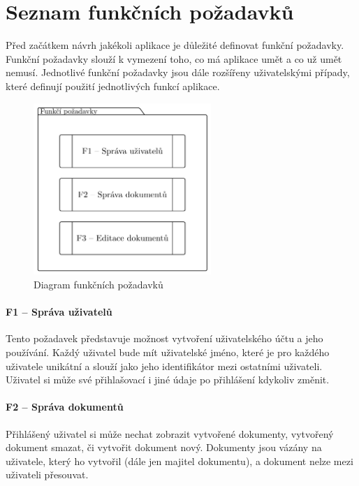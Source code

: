 
\section{Seznam funkčních požadavků}\label{sec:seznamFunkčníchPožadavků}

Před začátkem návrh jakékoli aplikace je důležité definovat funkční požadavky.
Funkční požadavky slouží k vymezení toho, co má aplikace umět a co už umět nemusí.
Jednotlivé funkční požadavky jsou dále rozšířeny uživatelskými případy, které definují použití jednotlivých funkcí aplikace.

\begin{figure}[ht!]
    \centering
    \includegraphics[width=0.6\textwidth]{partials/analyza/funkcniPozadavky.pdf}
    \caption{Diagram funkčních požadavků}\label{fig:funkciPozadavky}
\end{figure}

\paragraph{F1 -- Správa uživatelů}

Tento požadavek představuje možnost vytvoření uživatelského účtu a jeho používání.
Každý uživatel bude mít uživatelské jméno, které je pro každého uživatele unikátní a slouží jako jeho identifikátor mezi ostatními uživateli.
Uživatel si může své přihlašovací i jiné údaje po přihlášení kdykoliv změnit.

\paragraph{F2 -- Správa dokumentů}

Přihlášený uživatel si může nechat zobrazit vytvořené dokumenty, vytvořený dokument smazat, či vytvořit dokument nový.
Dokumenty jsou vázány na uživatele, který ho vytvořil (dále jen majitel dokumentu), a dokument nelze mezi uživateli přesouvat.

